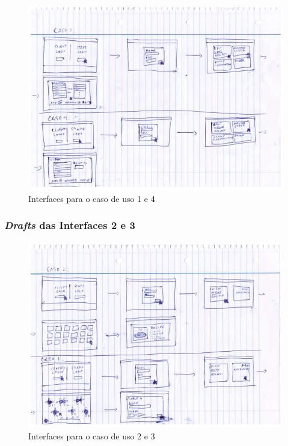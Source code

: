 \begin{figure}[!hbt]
    \centering
    \includegraphics[width=14cm]{Resources/Previous/image-110.jpg}
    \caption{Interfaces para o caso de uso 1 e 4}
    
\end{figure}
\FloatBarrier


\subsubsection{\textit{Drafts} das Interfaces 2 e 3}

\begin{figure}[!hbt]
    \centering
    \includegraphics[width=14cm]{Resources/Previous/image-111.jpg}
    \caption{Interfaces para o caso de uso 2 e 3}
    
\end{figure}
\FloatBarrier

